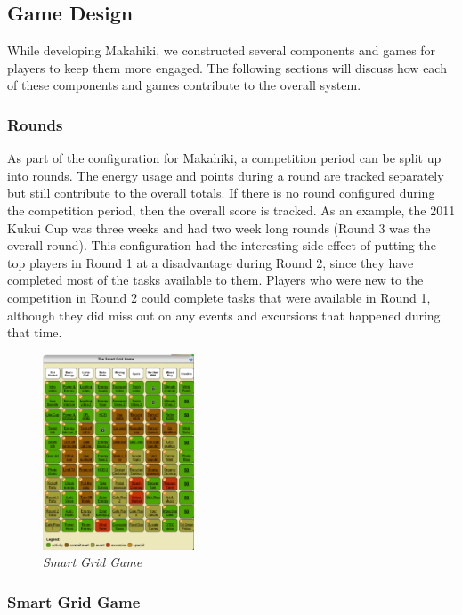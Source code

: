 \documentclass{acm_proc_article-sp}
\begin{document}
\subsection{Game Design}
\label{sys:GameDesign}

While developing Makahiki, we constructed several components and games for players to keep them more engaged. The following sections will discuss how each of these components and games contribute to the overall system.

\subsubsection{Rounds}

As part of the configuration for Makahiki, a competition period can be split up into rounds. The energy usage and points during a round are tracked separately but still contribute to the overall totals. If there is no round configured during the competition period, then the overall score is tracked. As an example, the 2011 Kukui Cup was three weeks and had two week long rounds (Round 3 was the overall round). This configuration had the interesting side effect of putting the top players in Round 1 at a disadvantage during Round 2, since they have completed most of the tasks available to them. Players who were new to the competition in Round 2 could complete tasks that were available in Round 1, although they did miss out on any events and excursions that happened during that time.

\begin{figure}[ht!]
  \center
  \includegraphics[width=0.4\textwidth]{smart-grid.eps}
  \caption{\em \small Smart Grid Game}
  \label{fig:SmartGrid}
\end{figure}

\subsubsection{Smart Grid Game}
\end{document}
